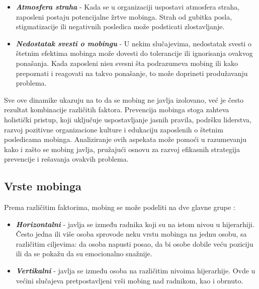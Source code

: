 \documentclass[a4paper]{article}
\begin{document}
\begin{itemize}
            \item \textbf{\textit{Atmosfera straha}} - Kada se u organizaciji uspostavi atmosfera straha, zaposleni postaju potencijalne žrtve mobinga. Strah od gubitka posla, stigmatizacije ili negativnih posledica može podsticati zlostavljanje.
            \item \textbf{\textit{Nedostatak svesti o mobingu}} - U nekim slučajevima, nedostatak svesti o štetnim efektima mobinga može dovesti do tolerancije ili ignorisanja ovakvog ponašanja. Kada zaposleni nisu svesni šta podrazumeva mobing ili kako prepoznati i reagovati na takvo ponašanje, to može doprineti produžavanju problema.
        \end{itemize}
        Sve ove dinamike ukazuju na to da se mobing ne javlja izolovano, već je često rezultat kombinacije različitih faktora.
        Prevencija mobinga stoga zahteva holistički pristup, koji uključuje uspostavljanje jasnih pravila, podršku liderstva, razvoj pozitivne organizacione kulture i
        edukaciju zaposlenih o štetnim posledicama mobinga. Analiziranje ovih aspekata može pomoći u razumevanju kako i zašto se mobing javlja, pružajući osnovu za razvoj efikasnih strategija prevencije i rešavanja ovakvih problema.
    
    \subsection{Vrste mobinga}
        Prema različitim faktorima, mobing se može podeliti na dve glavne grupe \cite{vrstemobinga}:
        \begin{itemize}
            \item \textbf{\textit{Horizontalni}} - javlja se između radnika koji su na istom nivou u hijerarhiji. Često jedna ili više osoba sprovode neku vrstu mobinga na jednu osobu, sa različitim ciljevima: da osoba napusti posao, da bi osobe dobile veću poziciju ili da se pokažu da su emocionalno snažnije.
            \item \textbf{\textit{Vertikalni}} - javlja se između osoba na različitim nivoima hijerarhije. Ovde u većini slučajeva pretpostavljeni vrši mobing nad radnikom, kao i obrnuto.
        \end{itemize}
        
\end{document}

